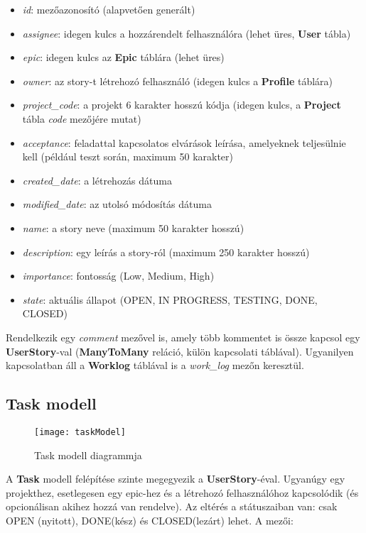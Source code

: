 \begin{itemize}
	\item \textit{id}: mezőazonosító (alapvetően generált)
	\item \textit{assignee}: idegen kulcs a hozzárendelt felhasználóra (lehet üres, \textbf{User} tábla)
	\item \textit{epic}: idegen kulcs az \textbf{Epic} táblára (lehet üres)
	\item \textit{owner}: az story-t létrehozó felhasználó (idegen kulcs a \textbf{Profile} táblára)
	\item \textit{project\_code}: a projekt 6 karakter hosszú kódja (idegen kulcs, a \textbf{Project} tábla \textit{code} mezőjére mutat)
	\item \textit{acceptance}: feladattal kapcsolatos elvárások leírása, amelyeknek teljesülnie kell (például teszt során, maximum 50 karakter)
	\item \textit{created\_date}: a létrehozás dátuma
	\item \textit{modified\_date}: az utolsó módosítás dátuma
	\item \textit{name}: a story neve (maximum 50 karakter hosszú)
	\item \textit{description}: egy leírás a story-ról (maximum 250 karakter hosszú)
	\item \textit{importance}: fontosság (Low, Medium, High)
	\item \textit{state}: aktuális állapot (OPEN, IN PROGRESS, TESTING, DONE, CLOSED)
\end{itemize}

Rendelkezik egy \textit{comment} mezővel is, amely több kommentet is össze kapcsol egy \textbf{UserStory}-val (\textbf{ManyToMany} reláció, külön kapcsolati táblával). Ugyanilyen kapcsolatban áll a \textbf{Worklog} táblával is a \textit{work\_log} mezőn keresztül.

\subsection{Task modell}

\begin{figure}[H]
	\centering
	\texttt{[image: taskModel]}
	\caption{Task modell diagrammja}
	\label{fig:taskmodel}
\end{figure}

A \textbf{Task} modell felépítése szinte megegyezik a \textbf{UserStory}-éval. Ugyanúgy egy projekthez, esetlegesen egy epic-hez és a létrehozó felhasználóhoz kapcsolódik (és opcionálisan akihez hozzá van rendelve). Az eltérés a státuszaiban van: csak OPEN (nyitott), DONE(kész) és CLOSED(lezárt) lehet. A mezői:

